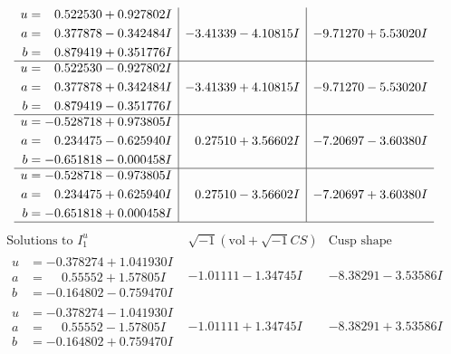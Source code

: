\documentclass[1p]{elsarticle_modified}
\theoremstyle{definition}
\newcommand{\I}{\sqrt{-1}}
\begin{document}
$$\begin{array}{c|c|c}
\begin{aligned}
u &= \phantom{-}0.522530 + 0.927802 I \\
a &= \phantom{-}0.377878 - 0.342484 I \\
b &= \phantom{-}0.879419 + 0.351776 I\end{aligned}
 & -3.41339 - 4.10815 I & -9.71270 + 5.53020 I \\ \hline\begin{aligned}
u &= \phantom{-}0.522530 - 0.927802 I \\
a &= \phantom{-}0.377878 + 0.342484 I \\
b &= \phantom{-}0.879419 - 0.351776 I\end{aligned}
 & -3.41339 + 4.10815 I & -9.71270 - 5.53020 I \\ \hline\begin{aligned}
u &= -0.528718 + 0.973805 I \\
a &= \phantom{-}0.234475 - 0.625940 I \\
b &= -0.651818 - 0.000458 I\end{aligned}
 & \phantom{-}0.27510 + 3.56602 I & -7.20697 - 3.60380 I \\ \hline\begin{aligned}
u &= -0.528718 - 0.973805 I \\
a &= \phantom{-}0.234475 + 0.625940 I \\
b &= -0.651818 + 0.000458 I\end{aligned}
 & \phantom{-}0.27510 - 3.56602 I & -7.20697 + 3.60380 I\\
 \hline 
 \end{array}$$\newpage$$\begin{array}{c|c|c}  
\text{Solutions to }I^u_{1}& \I (\text{vol} + \sqrt{-1}CS) & \text{Cusp shape}\\
 \hline 
\begin{aligned}
u &= -0.378274 + 1.041930 I \\
a &= \phantom{-}0.55552 + 1.57805 I \\
b &= -0.164802 - 0.759470 I\end{aligned}
 & -1.01111 - 1.34745 I & -8.38291 - 3.53586 I \\ \hline\begin{aligned}
u &= -0.378274 - 1.041930 I \\
a &= \phantom{-}0.55552 - 1.57805 I \\
b &= -0.164802 + 0.759470 I\end{aligned}
 & -1.01111 + 1.34745 I & -8.38291 + 3.53586 I \\ \hline\begin{aligned}

\end{aligned}
\end{array}$$
\end{document}
